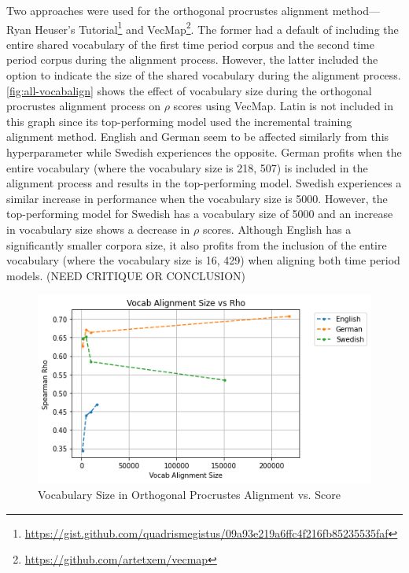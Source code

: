Two approaches were used for the orthogonal procrustes alignment method—Ryan Heuser’s Tutorial\footnote{\url{https://gist.github.com/quadrismegistus/09a93e219a6ffc4f216fb85235535faf}} and VecMap\footnote{\url{https://github.com/artetxem/vecmap}}. The former had a default of including the entire shared vocabulary of the first time period corpus and the second time period corpus during the alignment process. However, the latter included the option to indicate the size of the shared vocabulary during the alignment process. \autoref{fig:all-vocabalign} shows the effect of vocabulary size during the orthogonal procrustes alignment process on $\rho$ scores using VecMap. Latin is not included in this graph since its top-performing model used the incremental training alignment method. English and German seem to be affected similarly from this hyperparameter while Swedish experiences the opposite. German profits when the entire vocabulary (where the vocabulary size is 218, 507) is included in the alignment process and results in the top-performing model. Swedish experiences a similar increase in performance when the vocabulary size is 5000. However, the top-performing model for Swedish has a vocabulary size of 5000 and an increase in vocabulary size shows a decrease in $\rho$ scores. Although English has a significantly smaller corpora size, it also profits from the inclusion of the entire vocabulary (where the vocabulary size is 16, 429) when aligning both time period models. (NEED CRITIQUE OR CONCLUSION)

\begin{figure}[h]
  \centering
  \includegraphics[width=.8\linewidth]{sections/figures/vocabalignment_all.png}
  \caption{Vocabulary Size in Orthogonal Procrustes Alignment vs. Score}
  \label{fig:all-vocabalign}
\end{figure}

